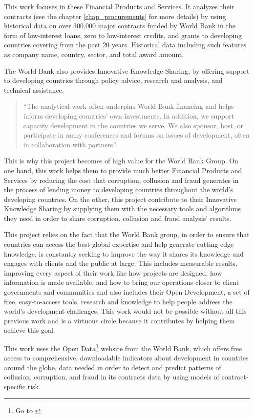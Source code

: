 This work focuses in these Financial Products and Services. It analyzes their contracts (see the chapter \ref{chap_procurements} for more details) by using historical data on over 300,000 major contracts funded by World Bank in the form of low-interest loans, zero to low-interest credits, and grants to developing countries covering  from the past 20 years. Historical data including such features as company name, country, sector, and total award amount.

The World Bank also provides Innovative Knowledge Sharing, by offering support to developing countries through policy advice, research and analysis, and technical assistance. \begin{quote}
``The analytical work often underpins World Bank financing and helps inform developing countries' own investments. In addition, we support capacity development in the countries we serve. We also sponsor, host, or participate in many conferences and forums on issues of development, often in collaboration with partners''\parencite{wb_about}.
\end{quote}

This is why this project becomes of high value for the World Bank Group. On one hand, this work helps them to provide much better Financial Products and Services by reducing the cost that corruption, collusion and fraud generates in the process of lending money to developing countries throughout the world's developing countries. On the other, this project contribute to their Innovative Knowledge Sharing by supplying them with the necessary tools and algorithms they need in order to share corruption, collusion and fraud analysis' results.

This project relies on the fact that the World Bank group, in order to ensure that countries can access the best global expertise and help generate cutting-edge knowledge, is constantly seeking to improve the way it shares its knowledge and engages with clients and the public at large. This includes  measurable results, improving every aspect of their work like how projects are designed, how information is made available, and how to bring our operations closer to client governments and communities and also includes  their Open Development, a set of free, easy-to-access tools, research and knowledge to help people address the world's development challenges. This work would not be possible without all this previous work and is a virtuous circle because it contributes by helping them achieve this goal.

This work uses the Open Data\footnote{Go to \cite{wb_data}} website from the World Bank, which offers free access to comprehensive, downloadable indicators about development in countries around the globe, data needed in order to detect and predict patterns of collusion, corruption, and fraud in its contracts data by using models of contract-specific risk. 

